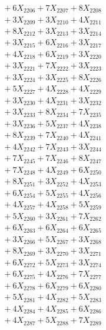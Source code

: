 \documentclass[a4paper,10pt]{article}
\begin{document}
{\begin{align}
&\;  + 6 X_{2206} + 7 X_{2207} + 8 X_{2208} \\[0.3ex]
&\;  + 3 X_{2209} + 3 X_{2210} + 4 X_{2211} \\[0.3ex]
&\;  + 8 X_{2212} + 3 X_{2213} + 3 X_{2214} \\[0.3ex]
&\;  + 3 X_{2215} + 6 X_{2216} + 3 X_{2217} \\[0.3ex]
&\;  + 4 X_{2218} + 6 X_{2219} + 3 X_{2220} \\[0.3ex]
&\;  + 3 X_{2221} + 7 X_{2222} + 3 X_{2223} \\[0.3ex]
&\;  + 3 X_{2224} + 3 X_{2225} + 8 X_{2226} \\[0.3ex]
&\;  + 5 X_{2227} + 4 X_{2228} + 4 X_{2229} \\[0.5ex]\allowbreak
&\;  + 3 X_{2230} + 4 X_{2231} + 3 X_{2232} \\[0.3ex]
&\;  + 3 X_{2233} + 8 X_{2234} + 7 X_{2235} \\[0.3ex]
&\;  + 3 X_{2236} + 5 X_{2237} + 4 X_{2238} \\[0.3ex]
&\;  + 8 X_{2239} + 7 X_{2240} + 4 X_{2241} \\[0.3ex]
&\;  + 4 X_{2242} + 7 X_{2243} + 3 X_{2244} \\[0.3ex]
&\;  + 7 X_{2245} + 7 X_{2246} + 8 X_{2247} \\[0.3ex]
&\;  + 7 X_{2248} + 4 X_{2249} + 6 X_{2250} \\[0.3ex]
&\;  + 8 X_{2251} + 3 X_{2252} + 4 X_{2253} \\[0.3ex]
&\;  + 6 X_{2254} + 5 X_{2255} + 4 X_{2256} \\[0.3ex]
&\;  + 4 X_{2257} + 4 X_{2258} + 5 X_{2259} \\[0.5ex]\allowbreak
&\;  + 5 X_{2260} + 3 X_{2261} + 7 X_{2262} \\[0.3ex]
&\;  + 6 X_{2263} + 6 X_{2264} + 6 X_{2265} \\[0.3ex]
&\;  + 3 X_{2266} + 5 X_{2267} + 3 X_{2268} \\[0.3ex]
&\;  + 8 X_{2269} + 3 X_{2270} + 3 X_{2271} \\[0.3ex]
&\;  + 6 X_{2272} + 5 X_{2273} + 3 X_{2274} \\[0.3ex]
&\;  + 6 X_{2275} + 4 X_{2276} + 7 X_{2277} \\[0.3ex]
&\;  + 6 X_{2278} + 6 X_{2279} + 6 X_{2280} \\[0.3ex]
&\;  + 5 X_{2281} + 4 X_{2282} + 5 X_{2283} \\[0.3ex]
&\;  + 4 X_{2284} + 4 X_{2285} + 6 X_{2286} \\[0.3ex]
&\;  + 4 X_{2287} + 5 X_{2288} + 7 X_{2289} \\[0.5ex]\allowbreak

\end{align}}
\end{document}
